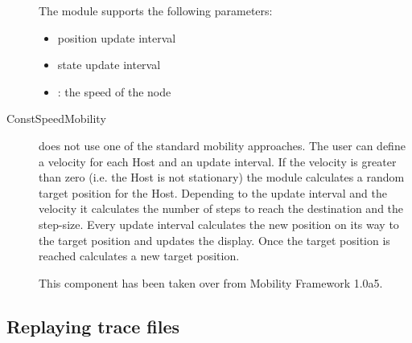 \begin{description}
The  module supports the following parameters:
\begin{itemize}
  \item {} position update interval
  \item {} state update interval
  \item {}: the speed of the node
\end{itemize}



\item[ConstSpeedMobility]

 does not use one of the standard mobility
approaches. The user can define a velocity for each Host and an update interval. If
the velocity is greater than zero (i.e. the Host is not stationary) the
 module calculates a random target position for the
Host. Depending to the update interval and the velocity it calculates the number of
steps to reach the destination and the step-size. Every update interval
 calculates the new position on its way to the
target position and updates the display. Once the target position is reached
 calculates a new target position.

This component has been taken over from Mobility Framework 1.0a5.



\end{description}

\subsection{Replaying trace files}

